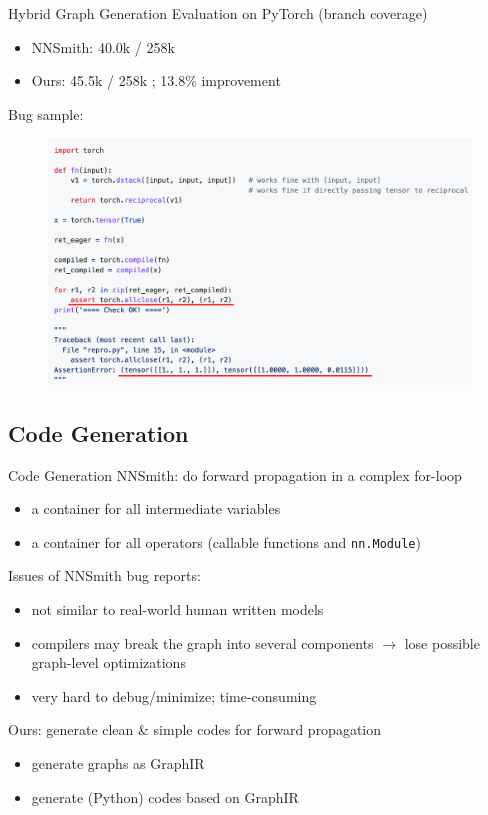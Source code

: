 \documentclass{beamer}
\begin{document}
\begin{frame}{Hybrid Graph Generation}
    Evaluation on PyTorch (branch coverage)
    \begin{itemize}
        \item NNSmith: 40.0k / 258k
        \item Ours: 45.5k / 258k ; 13.8\% improvement
    \end{itemize}
    Bug sample:
    \begin{figure}
        \centering
        \includegraphics[scale=0.18]{figs/bug_sample.png}
        \label{fig:bug_sample}
    \end{figure}
\end{frame}

\subsection{Code Generation}
\begin{frame}{Code Generation}
    NNSmith: do forward propagation in a complex for-loop
    \begin{itemize}
        \item a container for all intermediate variables
        \item a container for all operators (callable functions and \texttt{nn.Module})
    \end{itemize}
    Issues of NNSmith bug reports:
    \begin{itemize}
        \item not similar to real-world human written models
        \item compilers may break the graph into several components $\rightarrow$ lose possible graph-level optimizations
        \item very hard to debug/minimize; time-consuming
    \end{itemize}
    Ours: generate clean \& simple codes for forward propagation
    \begin{itemize}
        \item generate graphs as GraphIR
        \item generate (Python) codes based on GraphIR
    \end{itemize}
\end{frame}
\end{document}
